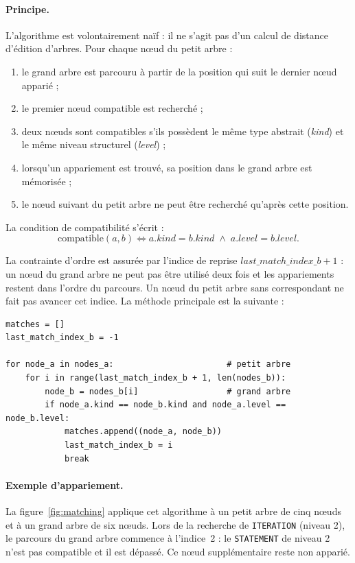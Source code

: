 {\paragraph{Principe.}
L'algorithme est volontairement naïf : il ne s'agit pas d'un calcul de
distance d'édition d'arbres. Pour chaque nœud du petit arbre :
\begin{enumerate}
  \item le grand arbre est parcouru à partir de la position qui suit le
        dernier nœud apparié ;
  \item le premier nœud compatible est recherché ;
  \item deux nœuds sont compatibles s'ils possèdent le même type abstrait
        (\emph{kind}) et le même niveau structurel (\emph{level}) ;
  \item lorsqu'un appariement est trouvé, sa position dans le grand arbre est
        mémorisée ;
  \item le nœud suivant du petit arbre ne peut être recherché qu'après cette
        position.
\end{enumerate}

La condition de compatibilité s'écrit :
\begin{equation}
\mathrm{compatible}(a,b) \iff a.\mathit{kind} = b.\mathit{kind}
\;\wedge\; a.\mathit{level} = b.\mathit{level}.
\end{equation}

La contrainte d'ordre est assurée par l'indice de reprise
$\mathit{last\_match\_index\_b} + 1$ : un nœud du grand arbre ne peut pas être
utilisé deux fois et les appariements restent dans l'ordre du parcours. Un
nœud du petit arbre sans correspondant ne fait pas avancer cet indice. La
méthode principale est la suivante :

\begin{lstlisting}[style=pyncst]
matches = []
last_match_index_b = -1

for node_a in nodes_a:                       # petit arbre
    for i in range(last_match_index_b + 1, len(nodes_b)):
        node_b = nodes_b[i]                  # grand arbre
        if node_a.kind == node_b.kind and node_a.level == node_b.level:
            matches.append((node_a, node_b))
            last_match_index_b = i
            break
\end{lstlisting}

\paragraph{Exemple d'appariement.}
La figure~\ref{fig:matching} applique cet algorithme à un petit arbre de cinq
nœuds et à un grand arbre de six nœuds. Lors de la recherche de
\texttt{ITERATION} (niveau 2), le parcours du grand arbre commence à
l'indice~2 : le \texttt{STATEMENT} de niveau 2 n'est pas compatible et il est
dépassé. Ce nœud supplémentaire reste non apparié.

}
